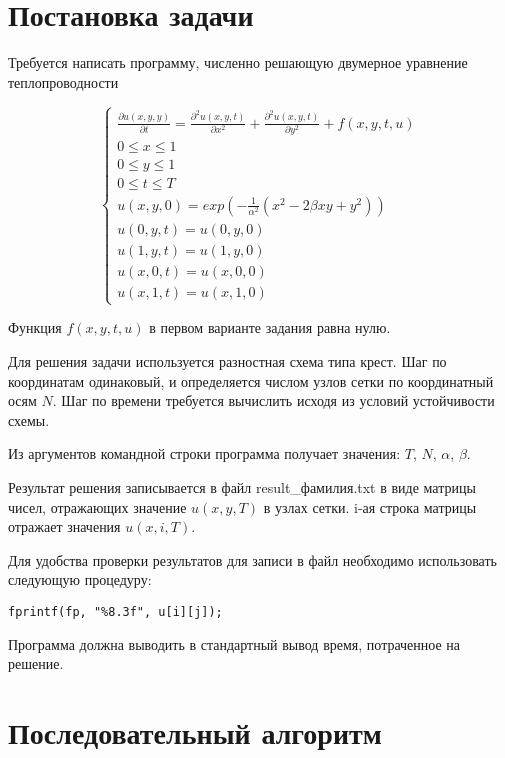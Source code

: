 \documentclass[11pt, oneside, a4paper]{article}
\begin{document}
\thispagestyle{empty}

\section{Постановка задачи}

Требуется написать программу, численно решающую двумерное уравнение теплопроводности

\begin{displaymath}
\left\{\begin{array}{l}
\frac{\partial u(x, y, y)}{\partial t} = \frac{\partial^2 u(x, y, t)}{\partial x^2} + \frac{\partial^2 u(x, y, t)}{\partial y^2} + f(x, y, t, u) \\
0 \le x \le 1 \\
0 \le y \le 1 \\
0 \le t \le T \\
u(x, y, 0) = exp(-\frac{1}{\alpha^2}(x^2 - 2 \beta x y + y^2)) \\
u(0, y, t) = u(0, y, 0) \\
u(1, y, t) = u(1, y, 0) \\
u(x, 0, t) = u(x, 0, 0) \\
u(x, 1, t) = u(x, 1, 0)
\end{array}\right.
\end{displaymath}

Функция $f(x, y, t, u)$ в первом варианте задания равна нулю.

Для решения задачи используется разностная схема типа крест. Шаг по координатам одинаковый, и определяется числом узлов сетки по координатный осям $N$. Шаг по времени требуется вычислить исходя из условий устойчивости схемы.

Из аргументов командной строки программа получает значения: $T$, $N$, $\alpha$, $\beta$.

Результат решения записывается в файл result\_фамилия.txt в виде матрицы чисел, отражающих значение $u(x, y, T)$ в узлах сетки. i-ая строка матрицы отражает значения $u(x, i, T)$.

Для удобства проверки результатов для записи в файл необходимо использовать следующую процедуру:

\begin{lstlisting}
fprintf(fp, "%8.3f", u[i][j]);
\end{lstlisting}

Программа должна выводить в стандартный вывод время, потраченное на решение.

\section{Последовательный алгоритм}
\end{document}
